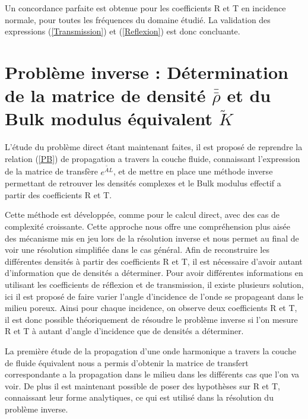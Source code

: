 \documentclass[12pt]{report}
\begin{document}
    Un concordance parfaite est obtenue pour les coefficients R et T en incidence normale, pour toutes les fréquences du domaine étudié. La validation des expressions (\ref{Transmission}) et (\ref{Reflexion}) est donc concluante. 

\chapter{Problème inverse : Détermination de la matrice de densité $\bar{\bar{\rho}}$ et du Bulk modulus équivalent $\tilde{K}$}
\label{Ch_Inv}
	L'étude du problème direct étant maintenant faites, il est proposé de reprendre la relation (\ref{PB}) de propagation a travers la couche fluide, connaissant l'expression de la matrice de transfère $e^{\bar{\bar{A}}L}$, et de mettre en place une méthode inverse permettant de retrouver les densités complexes et le Bulk modulus effectif a partir des coefficients R et T.
    
    Cette méthode est développée, comme pour le calcul direct, avec des cas de complexité croissante. Cette approche nous offre une compréhension plus aisée des mécanisme mis en jeu lors de la résolution inverse et nous permet au final de voir une résolution simplifiée dans le cas général. 
    Afin de reconstruire les différentes densités à partir des coefficients R et T, il est nécessaire d'avoir autant d'information que de densités a déterminer. Pour avoir différentes informations en utilisant les coefficients de réflexion et de transmission, il existe plusieurs solution, ici il est proposé de faire varier l'angle d'incidence de l'onde se propageant dans le milieu poreux. Ainsi pour chaque incidence, on observe deux coefficients R et T, il est donc possible théoriquement de résoudre le problème inverse si l'on mesure R et T à autant d'angle d'incidence que de densités a déterminer. 
    
    La première étude de la propagation d'une onde harmonique a travers la couche de fluide équivalent nous a permis d'obtenir la matrice de transfert correspondante a la propagation dans le milieu dans les différents cas que l'on va voir. De plus il est maintenant possible de poser des hypothèses sur R et T, connaissant leur forme analytiques, ce qui est utilisé dans la résolution du problème inverse.
    
\end{document}
